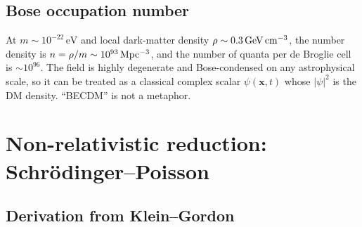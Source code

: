 \documentclass[12pt]{article}
\newcommand{\bx}{\mathbf{x}}
\newcommand{\eV}{\,\mathrm{eV}}
\begin{document}
\subsection{Bose occupation number}

At $m\sim 10^{-22}\eV$ and local dark-matter density
$\rho\sim 0.3\,{\rm GeV\,cm^{-3}}$, the number density is
$n = \rho/m\sim 10^{93}\,{\rm Mpc^{-3}}$, and the number of quanta per
de Broglie cell is $\sim 10^{96}$.  The field is highly degenerate and
Bose-condensed on any astrophysical scale, so it can be treated as a
classical complex scalar $\psi(\bx,t)$ whose $|\psi|^2$ is the DM
density.  ``BECDM'' is not a metaphor.

\section{Non-relativistic reduction: Schr\"odinger--Poisson}
\label{sec:sp}

\subsection{Derivation from Klein--Gordon}
\end{document}
